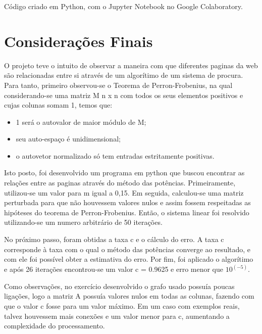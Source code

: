 \documentclass[a4paper, 12pt]{article}
\begin{document}
Código criado em Python, com o Jupyter Notebook no Google Colaboratory.

\section{Considerações Finais}

O projeto teve o intuito de observar a maneira com que diferentes paginas da web são relacionadas entre si através de um algorítimo de um sistema de procura. Para tanto, primeiro observou-se o Teorema de Perron-Frobenius, na qual considerando-se uma matriz M n x n com todos os seus elementos positivos e cujas colunas somam 1, temos que:

\begin{itemize}
   \item 1 será o autovalor de maior módulo de M;
   \item seu auto-espaço é unidimensional;
   \item o autovetor normalizado só tem entradas estritamente positivas.
 \end{itemize}

Isto posto, foi desenvolvido um programa em python que buscou encontrar as relações entre as paginas através do método das potências. Primeiramente, utilizou-se um valor para m igual a 0,15. Em seguida, calculou-se uma matriz perturbada para que não houvessem valores nulos e assim fossem respeitadas as hipóteses do teorema de Perron-Frobenius. Então, o sistema linear foi resolvido utilizando-se um numero arbitrário de 50 iterações.

No próximo passo, foram obtidas a taxa c e o cálculo do erro. A taxa c corresponde à taxa com o qual o método das potências converge ao resultado, e com ele foi possível obter a estimativa do erro. Por fim, foi aplicado o algorítimo e após 26 iterações  encontrou-se um valor c = 0.9625 e erro menor que $10^{(-5)}$.

Como observações, no exercício desenvolvido o grafo usado possuía poucas ligações, logo a matriz A possuía valores nulos em todas as colunas, fazendo com que o valor c fosse para um valor máximo. Em um caso com exemplos reais, talvez houvessem mais conexões e um valor menor para c, aumentando a complexidade do processamento.



\end{document}
